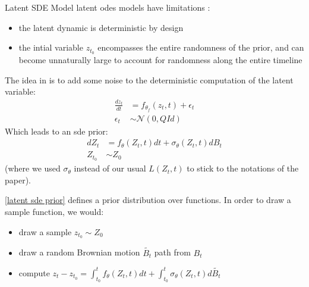 
\begin{frame}{Latent SDE Model}
    \glspl{latent ode} models have limitations :
        \begin{itemize}
            \item the latent dynamic is deterministic by design
            \item the intial variable $z_{t_0}$ encompasses the entire randomness of the prior, and can become
            unnaturally large to account for randomness along the entire timeline
        \end{itemize}

    The idea in \cite{li_scalable_2020} is to add some noise to the deterministic computation of the latent variable:
        \begin{align}
            \frac{dz_t}{dt} &= f_{\theta_f}(z_t,t) + \epsilon_t \\
            \epsilon_t &\sim \mathcal{N}(0,Q \textit{Id})
        \end{align}
    Which leads to an \gls{sde} prior:
        \begin{align}
            \label{latent sde prior}
            dZ_t &= f_{\theta}(Z_t, t)dt + \sigma_{\theta}(Z_t,t)dB_t \\
            Z_{t_0} &\sim Z_0
        \end{align}
    (where we used $\sigma_{\theta}$ instead of our usual $L(Z_t,t)$ to stick to the notations of the paper).

    \ref{latent sde prior} defines a prior distribution over functions. In order to draw a sample function, we would:
        \begin{itemize}
            \item draw a sample $z_{t_0} \sim Z_0$
            \item draw a random Brownian motion $\tilde{B_t}$ path from $B_t$
            \item compute $z_t - z_{t_0} = \int_{t_0}^{t} f_{\theta}(Z_t, t)dt + \int_{t_0}^{t} \sigma_{\theta}(Z_t,t)d\tilde{B_t}$
        \end{itemize}
\end{frame}

